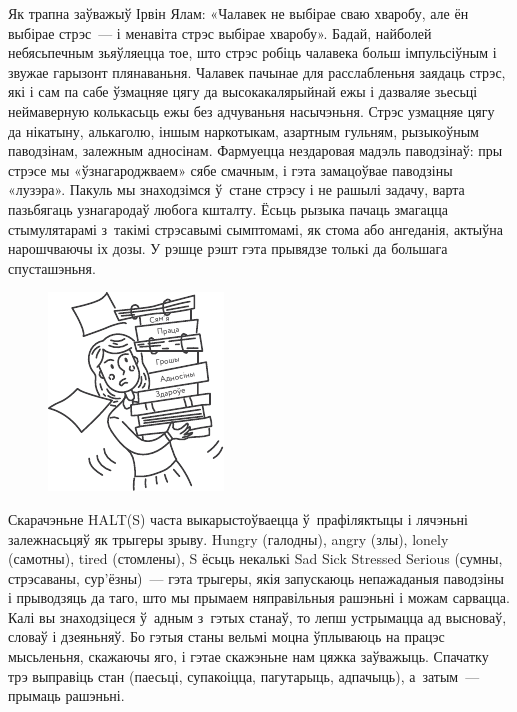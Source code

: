 Як трапна заўважыў Ірвін Ялам: «Чалавек не выбірае сваю хваробу, але ён выбірае стрэс~--- і менавіта стрэс выбірае хваробу». Бадай, найболей небясьпечным зьяўляецца тое, што стрэс робіць чалавека больш імпульсіўным і звужае гарызонт плянаваньня. Чалавек пачынае для расслабленьня заядаць стрэс, які і сам па сабе ўзмацняе цягу да высокакалярыйнай ежы і дазваляе зьесьці неймаверную колькасьць ежы без адчуваньня насычэньня. Стрэс узмацняе цягу да нікатыну, алькаголю, іншым наркотыкам, азартным гульням, рызыкоўным паводзінам, залежным адносінам. Фармуецца нездаровая мадэль паводзінаў: пры стрэсе мы «ўзнагароджваем» сябе смачным, і гэта замацоўвае паводзіны «лузэра». Пакуль мы знаходзімся ў~стане стрэсу і не рашылі задачу, варта пазьбягаць узнагародаў любога кшталту. Ёсьць рызыка пачаць змагацца стымулятарамі з~такімі стрэсавымі сымптомамі, як стома або ангеданія, актыўна нарошчваючы іх дозы. У рэшце рэшт гэта прывядзе толькі да большага спусташэньня. 

\begin{figure}[htb!]
  \centering
  \includegraphics[scale=1.5]{willpower/ch7/2.pdf}
\end{figure}


Скарачэньне HALT(S) часта выкарыстоўваецца ў~прафіляктыцы і лячэньні залежнасьцяў як трыгеры зрыву. Hungry (галодны), angry (злы), lonely (самотны), tired (стомлены), S ёсьць некалькі Sad Sick Stressed Serious (сумны, стрэсаваны, сур'ёзны)~--- гэта трыгеры, якія запускаюць непажаданыя паводзіны і прыводзяць да таго, што мы прымаем няправільныя рашэньні і можам сарвацца. Калі вы знаходзіцеся ў~адным з~гэтых станаў, то лепш устрымацца ад высноваў, словаў і дзеяньняў. Бо гэтыя станы вельмі моцна ўплываюць на працэс мысьленьня, скажаючы яго, і гэтае скажэньне нам цяжка заўважыць. Спачатку трэ выправіць стан (паесьці, супакоіцца, пагутарыць, адпачыць), а~затым~--- прымаць рашэньні.

